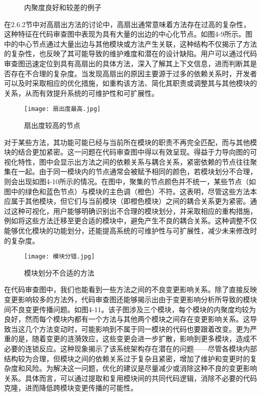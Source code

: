 \begin{figure}[!h]
    \setlength{\subfigcapskip}{-1bp}
    \centering
    \begin{minipage}{\textwidth}
    \centering
    \hspace{2em}
    \end{minipage}
    \vspace{0.2em}
    \caption{内聚度良好和较差的例子} %
\end{figure}


在2.6.2节中对高扇出方法的讨论中，高扇出通常意味着方法存在过高的复杂性，这种特征在代码审查图中表现为具有大量的出边的中心化节点。如图4-9所示。图中的中心节点通过大量出边与其他模块或方法产生关联，这种结构不仅揭示了方法的复杂性，也反映了其可能导致的维护难度和潜在的设计缺陷。用户可以通过代码审查图迅速定位到具有高扇出的具体方法，深入了解其上下文信息，进而判断其是否存在不合理的复杂度。当发现高扇出的原因主要源于过多的依赖关系时，开发者可以及时采取相应的优化措施，如重构该方法、简化其职责或调整其与其他模块的关系，从而有效提升系统的可维护性和可扩展性。

\begin{figure}[h]
\centering
\texttt{[image: 扇出度最高.jpg]}
\caption{扇出度较高的节点}
\end{figure}

对于某些方法，其功能可能已经与当前所在模块的职责不再完全匹配，而与其他模块的结合更加紧密。这一问题在代码审查图中得以有效呈现。得益于力导向图的可视化特性，图中会显示出方法之间的依赖关系与耦合关系，紧密依赖的节点往往聚集在一起。由于同一模块内的节点通常会被赋予相同的颜色，若模块划分不合理，则会出现如图4-10所示的情况。在图中，聚集的节点颜色并不统一，某些节点（如图中的绿色和蓝色节点）与模块的主色调（橙色）不符。这表明，尽管这些方法本应属于其他模块，但它们与当前模块（即橙色模块）之间的耦合关系更为紧密。通过这种可视化，用户能够明确识别出不合理的模块划分，并采取相应的重构措施，例如将这些方法迁移至更合适的模块中，避免产生不良的耦合关系。这种调整不仅能够优化模块的功能划分，还能提高系统的可维护性与可扩展性，减少未来修改时的复杂度。


\begin{figure}[h]
\centering
\texttt{[image: 模块分错.jpg]}
\caption{模块划分不合适的方法}
\end{figure}


在代码审查图中，我们也能看到一些方法之间的不良变更影响关系。除了直接反映变更影响较多的方法外，代码审查图还能够揭示出由于变更影响分析所导致的模块间不良变更传播问题。如图4-11。该子图涉及三个模块，每个模块的内聚度均较为良好，然而每个模块内都有一个方法与其他两个模块之间存在变更影响关系。这导致当这几个方法变动时，可能影响到不属于同一模块的代码也要跟着改变。更为严重的是，随着变更的涟漪效应，这些变更会进一步扩散，影响到更多模块，造成不必要的连锁反应。这种现象揭示了该系统架构存在潜在的问题——尽管各模块内部结构较为合理，但模块之间的依赖关系过于复杂且紧密，增加了维护和变更时的复杂度和风险。为解决这一问题，优化的建议是尽量减少或消除这种不良的变更影响关系。具体而言，可以通过提取和复用模块间的共同代码逻辑，消除不必要的代码克隆，进而降低跨模块变更传播的可能性。


